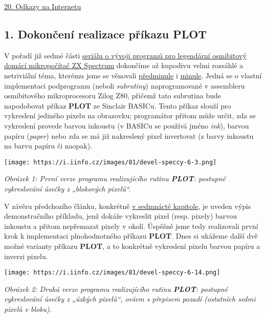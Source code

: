 \documentclass{article}
\renewcommand\includegraphics[2][]{}
\begin{document}
\protect\hyperlink{k20}{20. Odkazy na Internetu}

\hypertarget{k01}{%
\subsection{\texorpdfstring{1. Dokončení realizace příkazu
\textbf{PLOT}}{1. Dokončení realizace příkazu PLOT}}\label{k01}}

V pořadí již sedmé části
\href{https://www.root.cz/serialy/vyvoj-pro-slavne-zx-spectrum/}{seriálu
o vývoji programů pro legendární osmibitový domácí mikropočítač ZX
Spectrum} dokončíme až kupodivu velmi rozsáhlé a netriviální téma,
kterému jsme se věnovali
\href{https://www.root.cz/clanky/vyvoj-her-a-dem-pro-zx-spectrum-vlastni-vykreslovaci-subrutiny-podruhe/}{předminule}
i
\href{https://www.root.cz/clanky/vyvoj-pro-zx-spectrum-vlastni-vykreslovaci-subrutiny-potreti/}{minule}.
Jedná se o vlastní implementaci podprogramu (neboli \emph{subrutiny})
naprogramované v assembleru osmibitového mikroprocesoru Zilog Z80,
přičemž tato subrutina bude napodobovat příkaz \textbf{PLOT} ze Sinclair
BASICu. Tento příkaz slouží pro vykreslení jediného pixelu na obrazovku;
programátor přitom může určit, zda se vykreslení provede barvou inkoustu
(v BASICu se používá jméno \emph{ink}), barvou papíru (\emph{paper})
nebo zda se má již nakreslený pixel invertovat (z barvy inkoustu na
barvu papíru či naopak).

\texttt{[image: https://i.iinfo.cz/images/81/devel-speccy-6-3.png]}

\emph{Obrázek 1: První verze programu realizujícího rutinu
\textbf{PLOT}: postupné vykreslování úsečky z „blokových pixelů``.}

V závěru předchozího článku, konkrétně
\href{https://www.root.cz/clanky/vyvoj-pro-zx-spectrum-vlastni-vykreslovaci-subrutiny-potreti/\#k17}{v
sedmnácté kapitole}, je uveden výpis demonstračního příkladu, jenž
dokáže vykreslit pixel (resp. pixely) barvou inkoustu a přitom
nepřemazat pixely v okolí. Úspěšně jsme tedy realizovali první krok k
implementaci plnohodnotného příkazu \textbf{PLOT}. Dnes si ukážeme další
dvě možné varianty příkazu \textbf{PLOT}, a to konkrétně vykreslení
pixelu barvou papíru a inverzi pixelu.

\texttt{[image: https://i.iinfo.cz/images/81/devel-speccy-6-14.png]}

\emph{Obrázek 2: Druhá verze programu realizujícího rutinu
\textbf{PLOT}: postupné vykreslování úsečky z „úzkých pixelů``, ovšem s
přepisem pozadí (ostatních sedmi pixelů v bloku).}
\end{document}
